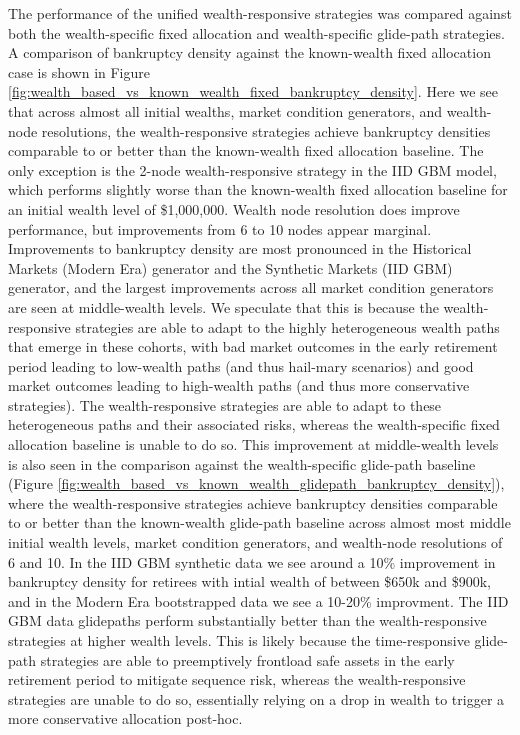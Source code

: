 \documentclass[11pt]{article}
\begin{document}
The performance of the unified wealth-responsive strategies was compared against both the wealth-specific fixed allocation and wealth-specific glide-path strategies. A comparison of bankruptcy density against the known-wealth fixed allocation case is shown in Figure \ref{fig:wealth_based_vs_known_wealth_fixed_bankruptcy_density}. Here we see that across almost all initial wealths, market condition generators, and wealth-node resolutions, the wealth-responsive strategies achieve bankruptcy densities comparable to or better than the known-wealth fixed allocation baseline. The only exception is the 2-node wealth-responsive strategy in the IID GBM model, which performs slightly worse than the known-wealth fixed allocation baseline for an initial wealth level of \$1,000,000. Wealth node resolution does improve performance, but improvements from 6 to 10 nodes appear marginal. Improvements to bankruptcy density are most pronounced in the Historical Markets (Modern Era) generator and the Synthetic Markets (IID GBM) generator, and the largest improvements across all market condition generators are seen at middle-wealth levels.   We speculate that this is because the wealth-responsive strategies are able to adapt to the highly heterogeneous wealth paths that emerge in these cohorts, with bad market outcomes in the early retirement period leading to low-wealth paths (and thus hail-mary scenarios) and good market outcomes leading to high-wealth paths (and thus more conservative strategies). The wealth-responsive strategies are able to adapt to these heterogeneous paths and their associated risks, whereas the wealth-specific fixed allocation baseline is unable to do so. This improvement at middle-wealth levels is also seen in the comparison against the wealth-specific glide-path baseline (Figure \ref{fig:wealth_based_vs_known_wealth_glidepath_bankruptcy_density}), where the wealth-responsive strategies achieve bankruptcy densities comparable to or better than the known-wealth glide-path baseline across almost most middle initial wealth levels, market condition generators, and wealth-node resolutions of 6 and 10. In the IID GBM synthetic data we see around a 10\% improvement in bankruptcy density for retirees with intial wealth of between \$650k and \$900k, and in the Modern Era bootstrapped data we see a 10-20\% improvment. The IID GBM data glidepaths perform substantially better than the wealth-responsive strategies at higher wealth levels. This is likely because the time-responsive glide-path strategies are able to preemptively frontload safe assets in the early retirement period to mitigate sequence risk, whereas the wealth-responsive strategies are unable to do so, essentially relying on a drop in wealth to trigger a more conservative allocation post-hoc. 
\end{document}
